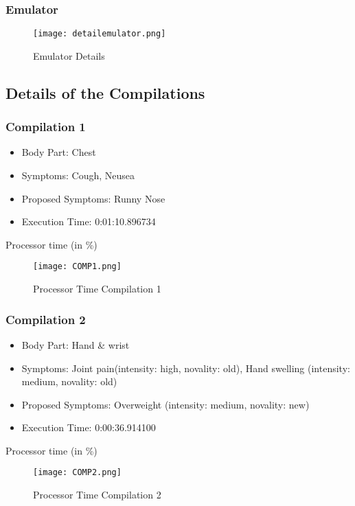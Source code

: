 \tocless\subsubsection{Emulator}
\begin{figure}[H]
	\centering
	\texttt{[image: detailemulator.png]}
	\caption{Emulator Details}
\end{figure}
\pagebreak
\tocless\subsection{Details of the Compilations}
\tocless\subsubsection{Compilation 1}
\begin{itemize}
	\item Body Part: Chest
	\item Symptoms: Cough, Neusea
	\item Proposed Symptoms: Runny Nose
	\item Execution Time: 0:01:10.896734
\end{itemize}
Processor time (in \%)
\begin{figure}[H]
	\centering
	\texttt{[image: COMP1.png]}
	\caption{Processor Time Compilation 1}
\end{figure}

\pagebreak
\subsubsection{Compilation 2}
\begin{itemize}
	\item Body Part: Hand \& wrist 
	\item Symptoms: Joint pain(intensity: high, novality: old), Hand swelling (intensity: medium, novality: old)
	\item Proposed Symptoms: Overweight (intensity: medium, novality: new)
	\item Execution Time: 0:00:36.914100
\end{itemize}
Processor time (in \%)
\begin{figure}[H]
	\centering
	\texttt{[image: COMP2.png]}
	\caption{Processor Time Compilation 2}
\end{figure}

\pagebreak
